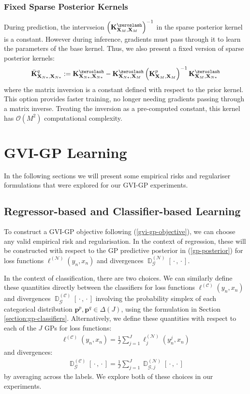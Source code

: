 \documentclass{article}
\newcommand{\D}{\operatorname{\mathbb{D}}}
\newcommand{\wc}{\operatorname{{}\cdot{}}}
\numberwithin{equation}{section}
\begin{document}
\subsubsection{Fixed Sparse Posterior Kernels}
During prediction, the intervseion $\left( \mathbf{K}^{\zeroslash}_{\mathbf{X}_M, \mathbf{X}_M} \right)^{-1}$ in the sparse posterior kernel is a constant. However during inference, gradients must pass through it to learn the parameters of the base kernel. Thus, we also present a fixed version of sparse posterior kernels:
\begin{align}
            \bar{\mathbf{K}}^q_{\mathbf{X}_{N*}, \mathbf{X}_{N*}} := \mathbf{K}^{\zeroslash}_{\mathbf{X}_{N*}, \mathbf{X}_{N*}} - \mathbf{K}^{\zeroslash}_{\mathbf{X}_{N*}, \mathbf{X}_M} \left( \mathbf{K}^{p}_{\mathbf{X}_M, \mathbf{X}_M} \right)^{-1} \mathbf{K}^{\zeroslash}_{\mathbf{X}_M, \mathbf{X}_{N*}}
\end{align}
where the matrix inversion is a constant defined with respect to the prior kernel. This option provides faster training, no longer needing gradients passing through a matrix inverse. Treating the inversion as a pre-computed constant, this kernel has $\mathcal{O}(M^2)$ computational complexity.

\newpage
\section{GVI-GP Learning}\label{section:gvi-gp-learning}
In the following sections we will present some empirical risks and regulariser formulations that were explored for our GVI-GP experiments.

\subsection{Regressor-based and Classifier-based Learning}
To construct a GVI-GP objective following (\ref{gvi-gp-objective}), we can choose any valid empirical risk and regularisation. In the context of regression, these will be constructed with respect to the GP predictive posterior in (\ref{gp-posterior}) for loss functions $\ell^{(\mathcal{N})}(y_n, x_n)$ and divergences $\D_{\mathcal{G}}^{(\mathcal{N})}[\wc, \wc]$.

In the context of classification, there are two choices. We can similarly define these quantities directly between the classifiers for loss functions $\ell^{(\mathcal{C})}(y_n, x_n)$ and divergences $\D^{(\mathcal{C})}_{\mathcal{G}}[\wc, \wc]$ involving the probability simplex of each categorical distribution $\mathbf{p}^p, \mathbf{p}^q \in \Delta(J)$, using the formulation in Section \ref{section:gp-classifiers}. Alternatively, we define these quantities with respect to each of the $J$ GPs for loss functions:
\begin{align}
    \ell^{(\mathcal{C})}(y_n, x_n) = \frac{1}{J}\sum_{j=1}^{J}\ell_j^{(\mathcal{N})}(y^j_n, x_n)
\end{align}
and divergences:
\begin{align}
    \D^{(\mathcal{C})}_{\mathcal{G}}[\wc, \wc] = \frac{1}{J}\sum_{j=1}^{J}\D_{\mathcal{G}, j}^{(\mathcal{N})}[\wc, \wc]
\end{align}
by averaging across the labels. We explore both of these choices in our experiments.
\end{document}
